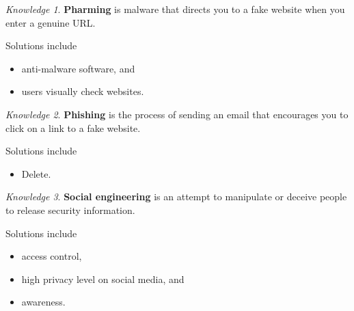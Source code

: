 \documentclass[8pt]{article}
\theoremstyle{remark}
\newtheorem{knowledge}{Knowledge}[subsection]
\begin{document}
            \begin{knowledge}
                \textbf{Pharming} is malware that directs you to a fake website when you enter a genuine URL.

                Solutions include
                \begin{itemize}
                    \item anti-malware software, and
                    \item users visually check websites.
                \end{itemize}
            \end{knowledge}

            \begin{knowledge}
                \textbf{Phishing} is the process of sending an email that encourages you to click on a link to a fake website.

                Solutions include
                \begin{itemize}
                    \item Delete.
                \end{itemize}
            \end{knowledge}

            \begin{knowledge}
                \textbf{Social engineering} is an attempt to manipulate or deceive people to release security information.

                Solutions include
                \begin{itemize}
                    \item access control,
                    \item high privacy level on social media, and
                    \item awareness.
                \end{itemize}
            \end{knowledge}
\end{document}
